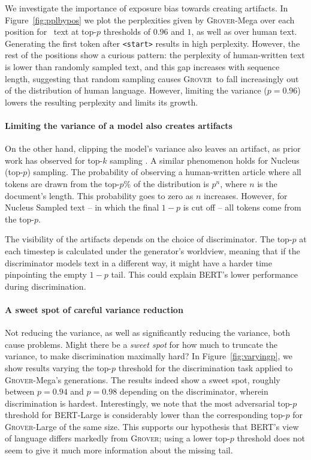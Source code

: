 \documentclass{article}
\newcommand{\modelname}{{\textsc{Grover}}}
\newcommand{\modelnamefordisc}{{\textsc{Grover}}}
\begin{document}
We investigate the importance of exposure bias towards creating artifacts. In Figure~\ref{fig:pplbypos} we plot the perplexities given by \modelname-Mega over each position for \bodyfield~text at top-$p$ thresholds of $0.96$ and $1$, as well as over human text. Generating the first token after {\tt\small <start\bodyfield>} results in high perplexity. However, the rest of the positions show a curious pattern: the perplexity of human-written text is lower than randomly sampled text, and this gap increases with sequence length, suggesting that random sampling causes \modelname~to fall increasingly out of the distribution of human language. However, limiting the variance ($p{=}0.96$) lowers the resulting perplexity and limits its growth.

\paragraph{Limiting the variance of a model also creates artifacts}
On the other hand, clipping the model's variance also leaves an artifact, as prior work has observed for top-$k$ sampling \citep{strobelt2019gltr}. A similar phenomenon holds for Nucleus (top-$p$) sampling. The probability of observing a human-written article where all tokens are drawn from the top-$p$\% of the distribution is $p^n$, where $n$ is the document's length. This probability goes to zero as $n$ increases. However, for Nucleus Sampled text -- in which the final $1{-}p$ is cut off -- all tokens come from the top-$p$. 

The visibility of the artifacts depends on the choice of discriminator.
The top-$p$ at each timestep is calculated under the generator's worldview, meaning that if the discriminator models text in a different way, it might have a harder time pinpointing the empty $1{-}p$ tail. This could explain BERT's lower performance during discrimination.

\paragraph{A sweet spot of careful variance reduction}
Not reducing the variance, as well as significantly reducing the variance, both cause problems. Might there be a \emph{sweet spot} for how much to truncate the variance, to make discrimination maximally hard? In Figure~\ref{fig:varyingp}, we show results varying the top-$p$ threshold for the discrimination task applied to \modelname-Mega's generations. The results indeed show a sweet spot, roughly between $p{=}0.94$ and $p{=}0.98$ depending on the discriminator, wherein discrimination is hardest. Interestingly, we note that the most adversarial top-$p$ threshold for BERT-Large is considerably lower than the corresponding top-$p$ for \modelnamefordisc-Large of the same size. This supports our hypothesis that BERT's view of language differs markedly from \modelname; using a lower top-$p$ threshold does not seem to give it much more information about the missing tail. 
\end{document}

